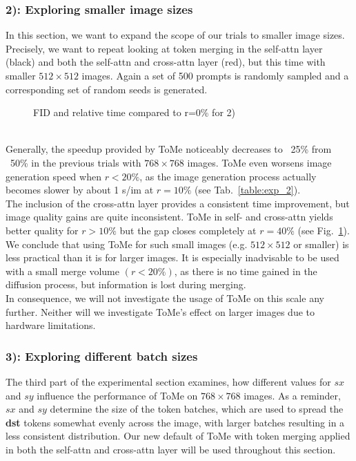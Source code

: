 \subsubsection*{2): Exploring smaller image sizes}
In this section, we want to expand the scope of our trials to smaller image sizes. Precisely, we want to repeat looking at token merging in the self-attn layer (black) and both the self-attn and cross-attn layer (red), but this time with smaller $512 \times 512$ images. Again a set of 500 prompts is randomly sampled and a corresponding set of random seeds is generated.
\begin{figure}[!htb]
    
    
\caption{FID and relative time compared to r=0\% for 2)}
\label{fig:exp_2}
\end{figure}\\
Generally, the speedup provided by ToMe noticeably decreases to ~25\% from ~50\% in the previous trials with \(768 \times 768\) images. ToMe even worsens image generation speed when \(r<20\%\), as the image generation process actually becomes slower by about 1 s/im at \(r=10\%\) (see Tab.~\ref{table:exp_2}).\\
The inclusion of the cross-attn layer provides a consistent time improvement, but image quality gains are quite inconsistent.
ToMe in self- and cross-attn yields better quality for \(r>10\%\) but the gap closes completely at \(r=40\%\) (see Fig.~\ref{fig:exp_2}).\\
We conclude that using ToMe for such small images (e.g. $512 \times 512$ or smaller) is less practical than it is for larger images. It is especially inadvisable to be used with a small merge volume \((r<20\%)\), as there is no time gained in the diffusion process, but information is lost during merging. \\
In consequence, we will not investigate the usage of ToMe on this scale any further. Neither will we investigate ToMe's effect on larger images due to hardware limitations.



\subsubsection*{3): Exploring different batch sizes}
The third part of the experimental section examines, how different values for \(sx\) and \(sy\) influence the performance of ToMe on $768 \times 768$ images. As a reminder, \(sx\) and \(sy\) determine the size of the token batches, which are used to spread the \textbf{dst} tokens somewhat evenly across the image, with larger batches resulting in a less consistent distribution. Our new default of ToMe with token merging applied in both the self-attn and cross-attn layer will be used throughout this section.



